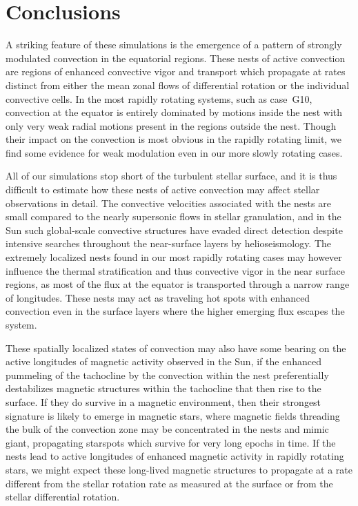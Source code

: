 
\clearpage
\section{Conclusions}
\label{sec:nests conclusion}
A striking feature of these simulations is the emergence of a 
pattern of strongly modulated convection in the equatorial regions.  These
nests of active convection are regions of enhanced convective vigor
and transport which propagate at rates distinct from either the mean
zonal flows of differential rotation or the individual convective
cells.  In the most rapidly rotating systems, such as case~G10,
convection at the equator is entirely dominated by motions inside the
nest with only very weak radial motions present in the regions
outside the nest.  Though their impact on the convection is most
obvious in the rapidly rotating limit, we find some evidence for weak
modulation even in our more slowly rotating cases.

All of our simulations stop short of the turbulent stellar surface,
and it is thus difficult to estimate how these nests of active
convection may affect stellar observations in detail.  The convective velocities
associated with the nests are small compared to the nearly supersonic
flows in stellar granulation, and in the Sun such global-scale
convective structures have evaded direct detection despite intensive
searches throughout the near-surface layers by helioseismology.  The
extremely localized nests found in our most rapidly rotating cases may
however influence the thermal stratification and thus convective vigor
in the near surface regions, as most of the flux at the equator is
transported through a narrow range of longitudes.  These nests may act
as traveling hot spots with enhanced convection even in the surface
layers where the higher emerging flux escapes the system.

These spatially localized states of convection may also have some bearing
on the active longitudes of magnetic activity observed in the Sun, if
the enhanced pummeling of the tachocline by the convection within the
nest preferentially destabilizes magnetic structures within the
tachocline that then rise to the surface.  
If they do survive in a magnetic environment, then their strongest signature is
likely to emerge in magnetic stars, where magnetic fields threading
the bulk of the convection zone may be concentrated in the nests and 
mimic giant, propagating starspots which survive for very long epochs
in time.  If the nests lead to active
longitudes of enhanced magnetic activity in rapidly rotating stars, we
might expect these long-lived magnetic structures to propagate at a
rate different from the stellar rotation rate as measured at the
surface or from the stellar differential rotation.

